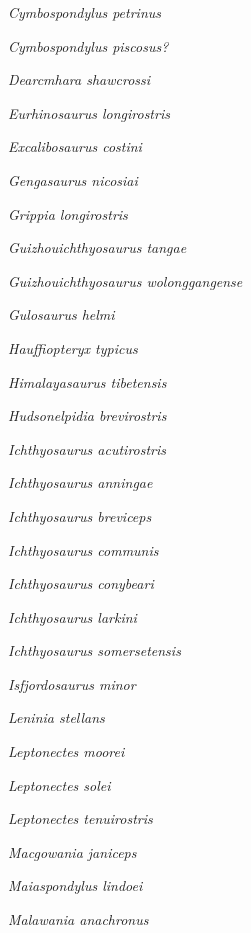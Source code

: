 \emph{Cymbospondylus petrinus}~

\emph{Cymbospondylus piscosus?}~

\emph{Dearcmhara shawcrossi}~

\emph{Eurhinosaurus longirostris}~

\emph{Excalibosaurus costini}~

\emph{Gengasaurus nicosiai}~

\emph{Grippia longirostris}~

\emph{Guizhouichthyosaurus tangae}~

\emph{Guizhouichthyosaurus wolonggangense}~

\emph{Gulosaurus helmi}~

\emph{Hauffiopteryx typicus}~

\emph{Himalayasaurus tibetensis}~

\emph{Hudsonelpidia brevirostris}~

\emph{Ichthyosaurus acutirostris}~

\emph{Ichthyosaurus anningae}~

\emph{Ichthyosaurus breviceps}~

\emph{Ichthyosaurus communis}~

\emph{Ichthyosaurus conybeari}~

\emph{Ichthyosaurus larkini}~

\emph{Ichthyosaurus somersetensis}~

\emph{Isfjordosaurus minor}~

\emph{Leninia stellans}~

\emph{Leptonectes moorei}~

\emph{Leptonectes solei}~

\emph{Leptonectes tenuirostris}~

\emph{Macgowania janiceps}~

\emph{Maiaspondylus lindoei}~

\emph{Malawania anachronus}~

